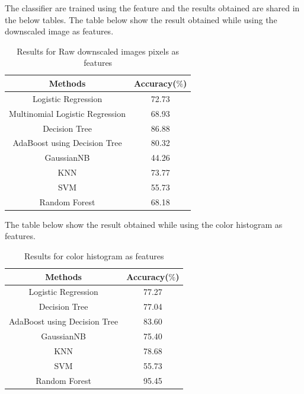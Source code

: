 \documentclass[journal]{IEEEtran}
\begin{document}
The classifier are trained using the feature and the results obtained are shared in the below tables.
The table below show the result obtained while using the downscaled image as features.
\begin{center}
\begin{table}[h!]
\centering
\begin{tabular}{ |c|c| } 
 \hline
 \rowcolor{gray}
 Methods & Accuracy($\%$)  \\ 
 \hline
 Logistic Regression & 72.73 \\
 \hline
 Multinomial Logistic Regression & 68.93\\
 \hline
 Decision Tree & 86.88 \\ 
 \hline
 AdaBoost using Decision Tree & 80.32  \\ 
 \hline
 GaussianNB & 44.26 \\
 \hline
 KNN & 73.77\\
 \hline
 SVM & 55.73\\
 \hline
 Random Forest & 68.18\\
 \hline
\end{tabular}
\caption{Results for Raw downscaled images pixels as features}
\label{table:1}
\end{table}
\end{center}

\vspace{0.5cm}

The table below show the result obtained while using the color histogram as features.
\begin{center}
\begin{table}[h!]
\centering
\begin{tabular}{ |c|c| } 
 \hline
 \rowcolor{gray}
 Methods & Accuracy($\%$)  \\ 
 \hline
 Logistic Regression & 77.27\\
 \hline
 Decision Tree & 77.04 \\ 
 \hline
 AdaBoost using Decision Tree & 83.60  \\ 
 \hline
 GaussianNB & 75.40 \\
 \hline
 KNN & 78.68\\
 \hline
 SVM & 55.73\\
 \hline
 Random Forest & 95.45\\
 \hline
\end{tabular}
\caption{Results for color histogram as features}
\label{table:1}
\end{table}
\end{center}
\end{document}
